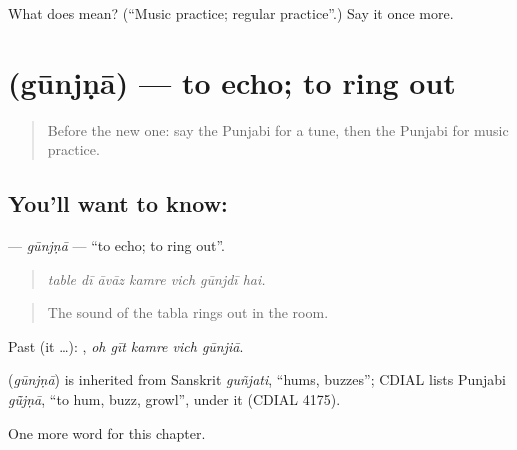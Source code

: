 \begin{tcolorbox}[breakable,colback=teal!4,colframe=teal!35!black,title={Before you move on}]
What does  mean? (\textquotedblleft{}Music practice; regular practice\textquotedblright{}.) Say it once more.
\end{tcolorbox}
\section[\texorpdfstring{\pa{ਗੂੰਜਣਾ} (gūnjṇā)}{ਗੂੰਜਣਾ (gūnjṇā)}]{ (gūnjṇā) — to echo; to ring out}

\label{lesson:PA-C348-gunjna}



\begin{quote}
Before the new one: say the Punjabi for a tune, then the Punjabi for music practice.
\end{quote}

\subsection*{You'll want to know: }
\textbf{} — \emph{gūnjṇā} — \textquotedblleft{}to echo; to ring out\textquotedblright{}.

\begin{quote}
      
\end{quote}

\begin{quote}
\emph{table dī āvāz kamre vich gūnjdī hai.}
\end{quote}

\begin{quote}
The sound of the tabla rings out in the room.
\end{quote}

Past (it …):     , \emph{oh gīt kamre vich gūnjiā}.

\begin{cousinweb}
\textbf{} (\emph{gūnjṇā}) is inherited from Sanskrit \emph{guñjati}, \textquotedblleft{}hums, buzzes\textquotedblright{}; CDIAL lists Punjabi \emph{gū̃jṇā}, \textquotedblleft{}to hum, buzz, growl\textquotedblright{}, under it (CDIAL 4175).
\end{cousinweb}

\begin{grammarlens}[title={What you've built}]
One more word for this chapter.
\end{grammarlens}

